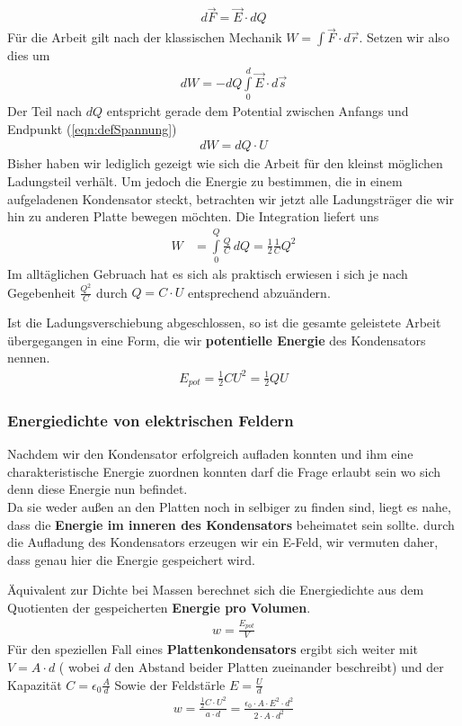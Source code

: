 \begin{align*}
d\vec{F} = \vec{E} \cdot dQ
\end{align*}
Für die Arbeit gilt nach der klassischen Mechanik $ W = \int \vec{F} \cdot d\vec{r}$. Setzen wir also dies um \begin{align*}
dW = - dQ \int \limits_0^d  \vec{E} \cdot d\vec{s}
\end{align*} Der Teil nach $dQ$ entspricht gerade dem Potential zwischen Anfangs und Endpunkt (\ref{eqn:defSpannung})\begin{align*}
dW = dQ \cdot U
\end{align*}Bisher haben wir lediglich gezeigt wie sich die Arbeit für den kleinst möglichen Ladungsteil verhält. Um jedoch die Energie zu bestimmen, die in einem aufgeladenen Kondensator steckt, betrachten wir jetzt alle Ladungsträger die wir hin zu anderen Platte bewegen möchten. Die Integration liefert uns \begin{align*}
W 	&= \int \limits_0^Q \frac{Q}{C}\,dQ = \frac{1}{2}\frac{1}{C}Q^2 
\end{align*}Im alltäglichen Gebruach hat es sich als praktisch erwiesen i
sich je nach Gegebenheit $\frac{Q^2}{C} $ durch $Q = C\cdot U$ entsprechend abzuändern. \par
Ist die Ladungsverschiebung abgeschlossen, so ist die gesamte geleistete Arbeit übergegangen in eine Form, die wir \textbf{potentielle Energie} des Kondensators nennen.
\begin{align} \label{eqn:elektrische Energie}
\boxed{E_{pot} = \tfrac{1}{2} C U^2 = \tfrac{1}{2}QU}
\end{align}


\subsubsection{Energiedichte von elektrischen Feldern}
Nachdem wir den Kondensator erfolgreich aufladen konnten und ihm eine charakteristische Energie zuordnen konnten darf die Frage erlaubt sein wo sich denn diese Energie nun befindet. \\ Da sie weder außen an den Platten noch in selbiger zu finden sind, liegt es nahe, dass die \textbf{Energie im inneren des Kondensators} beheimatet sein sollte. durch die Aufladung des Kondensators erzeugen wir ein E-Feld, wir vermuten daher, dass genau hier die Energie gespeichert wird. \par 
Äquivalent zur Dichte bei Massen berechnet sich die Energiedichte aus  dem Quotienten der gespeicherten \textbf{Energie pro Volumen}.\begin{align*}
w = \frac{E_{pot}}{V}
\end{align*} Für den speziellen Fall eines \textbf{Plattenkondensators} ergibt sich weiter mit $V = A \cdot d$ ( wobei $d$ den Abstand beider Platten zueinander beschreibt) und der Kapazität $C = \epsilon_0 \frac{A}{d}$ Sowie der Feldstärle $E = \frac{U}{d}$
\begin{align*}
w = \frac{\tfrac{1}{2} C \cdot U^2}{a \cdot d} = \frac{\epsilon_0 \cdot A \cdot E^2 \cdot d^2}{2 \cdot A \cdot d^2 }
\end{align*}

